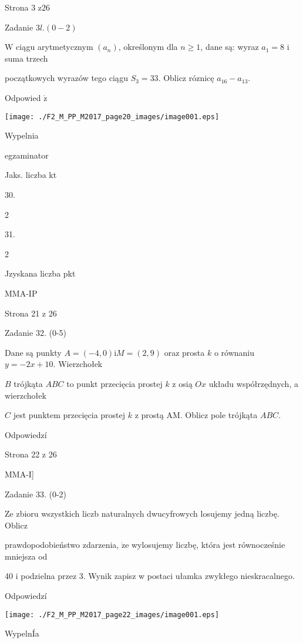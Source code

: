 \documentclass[a4paper,12pt]{article}
\begin{document}
Strona 3 z26





Zadanie $3l. (0-2)$

$\mathrm{W}$ ciągu arytmetycznym $(a_{n})$, określonym dla $n\geq 1$, dane są: wyraz $a_{1}=8$ i suma trzech

początkowych wyrazów tego ciągu $S_{3}=33$. Oblicz róznicę $a_{16}-a_{13}.$

Odpowied $\acute{\mathrm{z}}$
\begin{center}
\texttt{[image: ./F2\_M\_PP\_M2017\_page20\_images/image001.eps]}
\end{center}
Wypelnia

egzaminator

Jaks. liczba kt

30.

2

31.

2

Jzyskana liczba pkt

MMA-IP

Strona 21 z 26





Zadanie 32. (0-5)

Dane są punkty $A=(-4,0) \mathrm{i}M=(2,9)$ oraz prosta $k$ o równaniu $y=-2x+10$. Wierzchołek

$B$ trójkąta $ABC$ to punkt przecięcia prostej $k$ z osią $Ox$ układu współrzędnych, a wierzchołek

$C$ jest punktem przecięcia prostej $k$ z prostą AM. Oblicz pole trójkąta $ABC.$

Odpowiedzí

Strona 22 z 26

MMA-I]





Zadanie 33. (0-2)

Ze zbioru wszystkich liczb naturalnych dwucyfrowych losujemy jedną liczbę. Oblicz

prawdopodobieństwo zdarzenia, $\dot{\mathrm{z}}\mathrm{e}$ wylosujemy liczbę, która jest równocześnie mniejsza od

40 i podzielna przez 3. Wynik zapisz w postaci ułamka zwykłego nieskracalnego.

Odpowiedzí
\begin{center}
\texttt{[image: ./F2\_M\_PP\_M2017\_page22\_images/image001.eps]}
\end{center}
WypelnÍa
\end{document}
